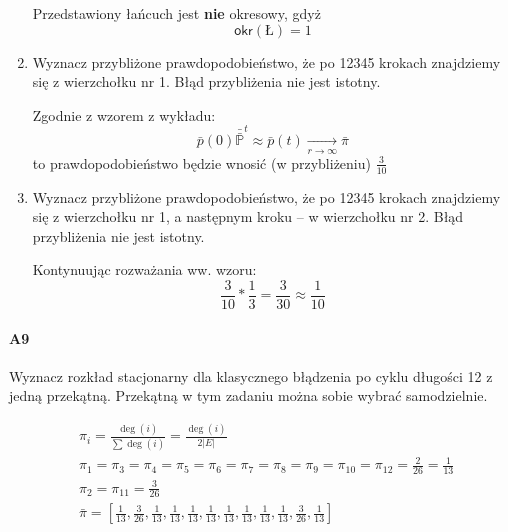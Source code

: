 \begin{enumerate}[label=\alph*)]
Przedstawiony łańcuch jest \textbf{nie} okresowy, gdyż
$$\mathsf{okr}(Ł)=1$$
\item Wyznacz przybliżone prawdopodobieństwo, że po 12345 krokach znajdziemy się z wierzchołku nr 1. Błąd przybliżenia nie jest istotny.

Zgodnie z wzorem z wykładu:
$$\bar{p}(0)\bar{\bar{\mathbb{P}}}^t\approx\bar{p}(t)\underset{r\rightarrow \infty}{\rightarrow} \bar{\pi}$$
to prawdopodobieństwo będzie wnosić (w przybliżeniu) $\frac{3}{10}$
\item Wyznacz przybliżone prawdopodobieństwo, że po 12345 krokach znajdziemy się z wierzchołku nr 1, a następnym kroku – w wierzchołku nr 2. Błąd przybliżenia nie jest istotny.

Kontynuując rozważania ww. wzoru:
$$\frac{3}{10}*\frac{1}{3}=\frac{3}{30}\approx\frac{1}{10}$$
\end{enumerate}

\paragraph{A9} Wyznacz rozkład stacjonarny dla klasycznego błądzenia po cyklu długości 12 z jedną przekątną. Przekątną w tym zadaniu można sobie wybrać samodzielnie.
\begin{figure}[H]
\centering
{}
\end{figure}
\begin{align*}
&\pi _{i}=\frac{\deg (i)}{\sum \deg (i)}=\frac{\deg (i)}{2|E|}\\
&\pi _{1}=\pi _{3}=\pi _{4}=\pi _{5}=\pi _{6}=\pi _{7}=\pi _{8}=\pi _{9}=\pi _{10}=\pi _{12}=\frac{2}{26}=\frac{1}{13}\\
&\pi _{2}=\pi _{11}=\frac{3}{26}\\
&\bar{\pi}=\left[\frac{1}{13},\frac{3}{26},\frac{1}{13},\frac{1}{13},\frac{1}{13},\frac{1}{13},\frac{1}{13},\frac{1}{13},\frac{1}{13},\frac{1}{13},\frac{3}{26},\frac{1}{13}\right]
\end{align*}

